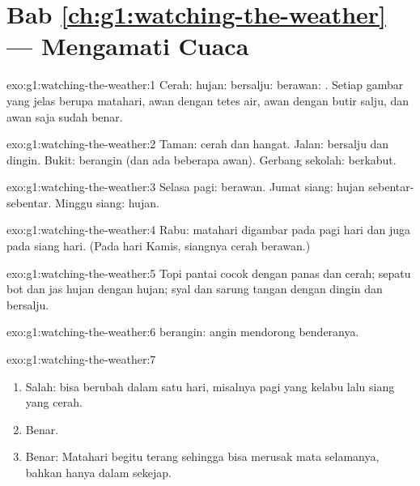 \section*{Bab \ref{ch:g1:watching-the-weather} --- Mengamati Cuaca}

\begin{solution}{exo:g1:watching-the-weather:1}
Cerah: \quad hujan: \quad bersalju: \quad
berawan: . Setiap gambar yang jelas berupa matahari, awan
dengan tetes air, awan dengan butir salju, dan awan saja sudah benar.
\end{solution}

\begin{solution}{exo:g1:watching-the-weather:2}
Taman: cerah dan hangat. Jalan: bersalju dan dingin. Bukit: berangin (dan
ada beberapa awan). Gerbang sekolah: berkabut.
\end{solution}

\begin{solution}{exo:g1:watching-the-weather:3}
Selasa pagi: berawan. Jumat siang: hujan sebentar-sebentar. Minggu siang:
hujan.
\end{solution}

\begin{solution}{exo:g1:watching-the-weather:4}
Rabu: matahari digambar pada pagi hari dan juga pada siang hari.
(Pada hari Kamis, siangnya cerah berawan.)
\end{solution}

\begin{solution}{exo:g1:watching-the-weather:5}
Topi pantai cocok dengan  panas dan cerah; sepatu bot dan jas hujan
dengan  hujan; syal dan sarung tangan dengan  dingin dan bersalju.
\end{solution}

\begin{solution}{exo:g1:watching-the-weather:6}
 berangin: angin mendorong benderanya.
\end{solution}

\begin{solution}{exo:g1:watching-the-weather:7}
\begin{enumerate}
  \item Salah:  bisa berubah dalam satu hari, misalnya pagi yang
        kelabu lalu siang yang cerah.
  \item Benar.
  \item Benar: Matahari begitu terang sehingga bisa merusak mata
        selamanya, bahkan hanya dalam sekejap.
\end{enumerate}
\end{solution}


